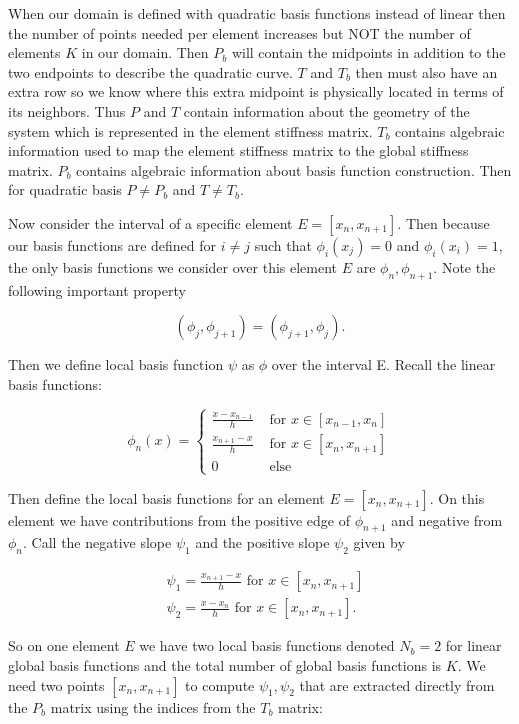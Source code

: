 \documentclass[12pt, oneside]{book}
\begin{document}
When our domain is defined with quadratic basis functions instead of linear then the number of points needed per element
increases but NOT the number of elements $K$ in our domain. Then $P_b$ will contain the midpoints in addition to the two endpoints 
to describe the quadratic curve. $T$ and $T_b$ then must also have an extra row so we know where this extra midpoint is physically 
located in terms of its neighbors. Thus $P$ and $T$ contain information about the geometry of the system which is represented in the 
element stiffness matrix. $T_{b}$ contains algebraic information used to map the element stiffness 
matrix to the global stiffness matrix. $P_b$ contains algebraic information about basis function construction. Then for 
quadratic basis $P \neq P_{b}$ and $T \neq T_{b}$. 
\par Now consider the interval of a specific element 
$E=\left[x_{n}, x_{n+1}\right]$. Then because our basis functions are defined for 
$i \neq j$ such that $\phi_{i}\left(x_{j}\right)=0$ and $\phi_{i}\left(x_{i}\right)=1$, the only basis functions we 
consider over this element $E$ are $\phi_{n}, \phi_{n+1}$. Note the following important property

$$
\left(\phi_{j}, \phi_{j+1}\right)=\left(\phi_{j+1}, \phi_{j}\right).
$$

Then we define local basis function $\psi$ as $\phi$ over the interval E.
Recall the linear basis functions:

$$
\phi_{n}(x)=\left\{\begin{array}{cl}
\frac{x-x_{n-1}}{h} & \text { for } x \in\left[x_{n-1}, x_{n}\right] \\
\frac{x_{n+1}-x}{h} & \text { for } x \in\left[x_{n}, x_{n+1}\right] \\
0 & \text { else }
\end{array}\right.
$$

Then define the local basis functions for an element $E=\left[x_{n}, x_{n+1}\right]$. On this element we have 
contributions from the positive edge of $\phi_{n+1}$ and negative from $\phi_{n}$. Call the negative slope $\psi_{1}$  
and the positive slope $\psi_{2}$ given by

$$
\begin{aligned}
& \psi_{1}=\frac{x_{n+1}-x}{h} \text { for } x \in\left[x_{n}, x_{n+1}\right] \\
& \psi_{2}=\frac{x-x_{n}}{h} \text { for } x \in\left[x_{n}, x_{n+1}\right]. 
\end{aligned}
$$

So on one element $E$ we have two local basis functions denoted $N_b=2$ for linear global basis functions 
and the total number of global basis functions is $K$. We need two points $\left[x_{n}, x_{n+1}\right]$ to 
compute $\psi_{1}, \psi_{2}$ that are extracted directly from the $P_{b}$ matrix using the indices from the $T_b$ matrix:
\end{document}
